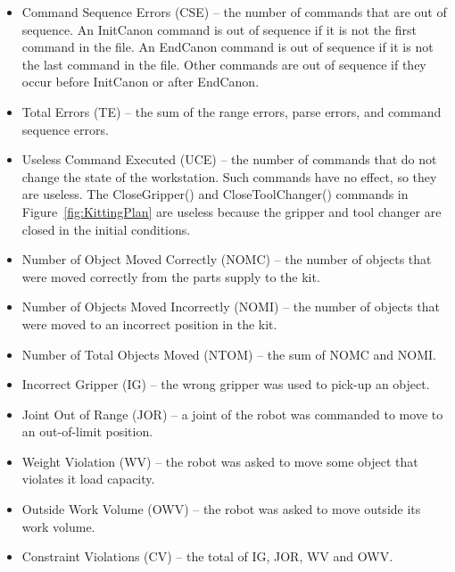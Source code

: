 \begin{itemize}
\item \sf Command Sequence Errors (CSE) \rm -- the number of commands that are
  out of sequence. An InitCanon command is out of sequence if it is not the
  first command in the file. An EndCanon command is out of sequence if it
  is not the last command in the file. Other commands are out of sequence
  if they occur before InitCanon or after EndCanon.\\

\item \sf Total Errors (TE) \rm -- the sum of the range errors, parse errors,
  and command sequence errors.\\

\item \sf Useless Command Executed (UCE) \rm -- the number of commands that do
  not change the state of the workstation. Such commands have no effect, so
  they are useless. The \sf CloseGripper() \rm and \sf CloseToolChanger()
  \rm commands in Figure~\ref{fig:KittingPlan} are useless because the
  gripper and tool changer are closed in the initial conditions.\\
  
\item \sf Number of Object Moved Correctly (NOMC) \rm -- the number of objects
  that were moved correctly from the parts supply to the kit.\\

\item \sf Number of Objects Moved Incorrectly (NOMI) \rm -- the number of objects
  that were moved to an incorrect position in the kit.\\
  
\item \sf Number of Total Objects Moved (NTOM) \rm -- the sum of NOMC and NOMI.\\

\item \sf Incorrect Gripper (IG) \rm -- the wrong gripper was used to pick-up an object.\\

\item \sf Joint Out of Range (JOR) \rm -- a joint of the robot was commanded to 
  move to an out-of-limit position.\\

\item \sf Weight Violation (WV) \rm -- the robot was asked to move some object that
  violates it load capacity.\\
  
\item \sf Outside Work Volume (OWV) \rm -- the robot was asked to move outside its
  work volume.\\
  
\item \sf Constraint Violations (CV) \rm -- the total of IG, JOR, WV and OWV.

\end{itemize}

